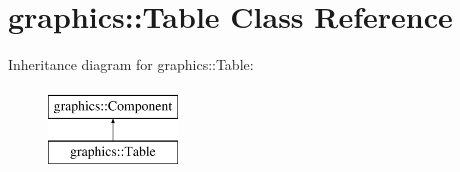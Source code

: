 \hypertarget{classgraphics_1_1_table}{\section{graphics\-:\-:Table Class Reference}
\label{classgraphics_1_1_table}
}
Inheritance diagram for graphics\-:\-:Table\-:\begin{figure}[H]
\begin{center}
\leavevmode
\includegraphics[height=2.000000cm]{classgraphics_1_1_table}
\end{center}
\end{figure}
